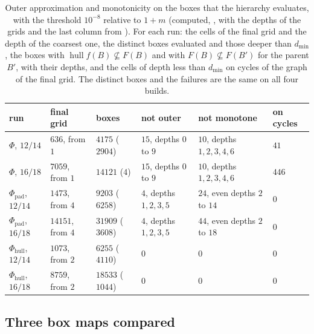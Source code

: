 \documentclass[11pt]{article}
\theoremstyle{plain}
\theoremstyle{definition}
\theoremstyle{remark}
\DeclareMathOperator{\hull}{hull}
\newcommand{\dmin}{d_{\min}}
\newcommand{\Phipad}{\Phi_{\mathrm{pad}}}
\newcommand{\Phihull}{\Phi_{\mathrm{hull}}}
\begin{document}
\begin{table}[tbp]
\centering
\caption{Outer approximation and monotonicity on the boxes that the hierarchy evaluates, with the threshold $10^{-8}$ relative to $1+m$ (computed, , with the depths of the grids and the last column from ). For each run: the cells of the final grid and the depth of the coarsest one, the distinct boxes evaluated and those deeper than $\dmin$, the boxes with $\hull f(B)\not\subseteq F(B)$ and with $F(B)\not\subseteq F(B')$ for the parent $B'$, with their depths, and the cells of depth less than $\dmin$ on cycles of the graph of the final grid. The distinct boxes and the failures are the same on all four builds.}\label{tab:boxes}
\small
\begin{tabular}{llllll}
\toprule
run & final grid & boxes & not outer & not monotone & on cycles \\
\midrule
$\Phi$, $12/14$ & $636$, from $1$ & $4175$ ($2904$) & $15$, depths $0$ to $9$ & $10$, depths $1,2,3,4,6$ & $41$ \\
$\Phi$, $16/18$ & $7059$, from $1$ & $14121$ ($4$) & $15$, depths $0$ to $9$ & $10$, depths $1,2,3,4,6$ & $446$ \\
$\Phipad$, $12/14$ & $1473$, from $4$ & $9203$ ($6258$) & $4$, depths $1,2,3,5$ & $24$, even depths $2$ to $14$ & $0$ \\
$\Phipad$, $16/18$ & $14151$, from $4$ & $31909$ ($3608$) & $4$, depths $1,2,3,5$ & $44$, even depths $2$ to $18$ & $0$ \\
$\Phihull$, $12/14$ & $1073$, from $2$ & $6255$ ($4110$) & $0$ & $0$ & $0$ \\
$\Phihull$, $16/18$ & $8759$, from $2$ & $18533$ ($1044$) & $0$ & $0$ & $0$ \\
\bottomrule
\end{tabular}
\end{table}

\subsection{Three box maps compared}\label{sec:compare}
\end{document}
